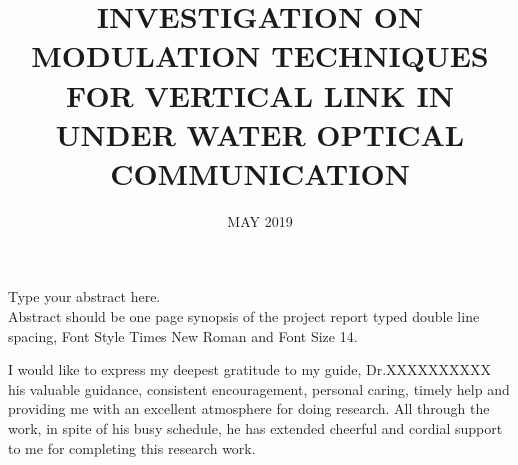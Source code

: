 \documentclass[BTech]{srmuthesis}
\begin{document}

\title{INVESTIGATION ON MODULATION TECHNIQUES FOR 
VERTICAL LINK IN UNDER WATER OPTICAL COMMUNICATION
} %

\firstauthorregno{[RA1511004010067]}
\secondauthorregno{[RA1511004010070]}
\thirdauthorregno{[RA1511004010310]}
\fourthauthorregno{[RA1511004010332]}
\fifthauthor{}
\fifthauthorregno{}
\date{MAY 2019} %

\maketitle
\certificate





\abstract
\begin{doublespacing}
{\large\noindent Type your abstract here.\\

 Abstract should be one page synopsis of the project report typed double line spacing, Font Style Times New Roman and Font Size 14.}
\end{doublespacing}

\pagebreak
\acknowledgements
I would like to express my deepest gratitude to my guide, Dr.XXXXXXXXXX
his valuable guidance, consistent encouragement, personal caring, timely help and providing me with an excellent atmosphere for doing research. All through the work, in spite of his busy schedule, he has extended cheerful and cordial support to me for completing this research work.\\
\end{document}
